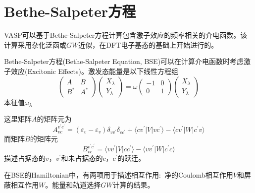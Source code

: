 \section{\rm{Bethe-Salpeter}方程}
\textrm{VASP}可以基于\textrm{Bethe-Salpeter}方程计算包含激子效应的频率相关的介电函数。该计算采用杂化泛函或$GW$近似，在\textrm{DFT}电子基态的基础上开始进行的。

\textrm{Bethe-Salpeter}方程\textrm{(Bethe-Salpeter Equation, BSE)}可以在计算介电函数时考虑激子效应\textrm{(Excitonic Effects)}。激发态能量是以下线性方程组
\begin{displaymath}
\begin{pmatrix}
	A &B\\
	B^{\ast} &A^{\ast}
\end{pmatrix}
\begin{pmatrix}
	X_{\lambda}\\
	Y_{\lambda}
\end{pmatrix}=\omega
\begin{pmatrix}
	-1 &0\\
	0 &1
\end{pmatrix}
\begin{pmatrix}
	X_{\lambda}\\
	Y_{\lambda}
\end{pmatrix}
\end{displaymath}
本征值$\omega_{\lambda}$

这里矩阵$A$的矩阵元为
\begin{displaymath}
	A_{vc}^{v^{\prime}c^{\prime}}=(\varepsilon_v-\varepsilon_v)\delta_{vv^{\prime}}\delta_{cc^{\prime}}+\langle cv^{\prime}|V|vc^{\prime}\rangle-\langle cv^{\prime}|W|c^{\prime}v\rangle
\end{displaymath}
而矩阵$B$的矩阵元
\begin{displaymath}
	B_{vc}^{v^{\prime}c^{\prime}}=\langle vv^{\prime}|V|cc^{\prime}\rangle-\langle vv^{\prime}|W|c^{\prime}c\rangle
\end{displaymath}
描述占据态的$v$，$v^{\prime}$和未占据态的$c$，$c^{\prime}$的跃迁。

在\textrm{BSE}的\textrm{Hamiltonian}中，有两项用于描述相互作用:~净的\textrm{Coulomb}相互作用$V$和屏蔽相互作用$W$。能量和轨道选择$GW$计算的结果。

